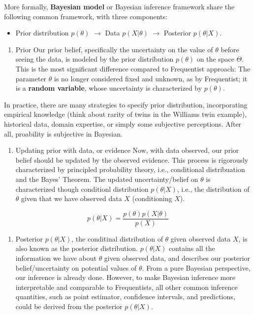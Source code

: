 \documentclass[
]{book}
\providecommand{\tightlist}{%
  \setlength{\itemsep}{0pt}\setlength{\parskip}{0pt}}
\begin{document}
More formally, \textbf{Bayesian model} or Bayesian inference framework share the following common framework, with three components:

\begin{itemize}
\tightlist
\item
  Prior distribution \(p(\theta)\) \(\rightarrow\) Data \(p(X|\theta)\) \(\rightarrow\) Posterior \(p(\theta|X)\).
\end{itemize}

\begin{enumerate}
\def\labelenumi{\arabic{enumi}.}
\tightlist
\item
  Prior
  Our prior belief, specifically the uncertainty on the value of \(\theta\) before seeing the data, is modeled by the prior distribution \(p(\theta)\) on the space \(\Theta\). This is the most significant difference compared to Frequentist approach: The parameter \(\theta\) is no longer considered fixed and unknown, as by Frequentist; it is a \textbf{random variable}, whose uncertainty is characterized by \(p(\theta)\).
\end{enumerate}

In practice, there are many strategies to specify prior distribution, incorporating empirical knowledge (think about rarity of twins in the Williams twin example), historical data, domain expertise, or simply some subjective perceptions. After all, proability is subjective in Bayesian.

\begin{enumerate}
\def\labelenumi{\arabic{enumi}.}
\setcounter{enumi}{1}
\tightlist
\item
  Updating prior with data, or evidence
  Now, with data observed, our prior belief should be updated by the observed evidence. This process is rigorously characterized by principled probability theory, i.e., conditional distribuation and the Bayes' Theorem. The updated uncertainty/belief on \(\theta\) is characterized though conditionl distribution \(p(\theta|X)\), i.e., the distribution of \(\theta\) given that we have observed data \(X\) (conditioning \(X\)).
\end{enumerate}

\[
p(\theta|X) =\frac{p(\theta)p(X|\theta)}{p(X)}
\]

\begin{enumerate}
\def\labelenumi{\arabic{enumi}.}
\setcounter{enumi}{2}
\tightlist
\item
  Posterior
  \(p(\theta|X)\), the conditinal distribution of \(\theta\) given observed data \(X\), is also known as the posterior distribution. \(p(\theta|X)\) contains all the information we have about \(\theta\) given observed data, and describes our posterior belief/uncertainty on potential values of \(\theta\). From a pure Bayesian perspective, our inference is already done. However, to make Bayesian inference more interpretable and comparable to Frequentists, all other common inference quantities, such as point estimator, confidence intervals, and predictions, could be derived from the posterior \(p(\theta|X)\).
\end{enumerate}
\end{document}

